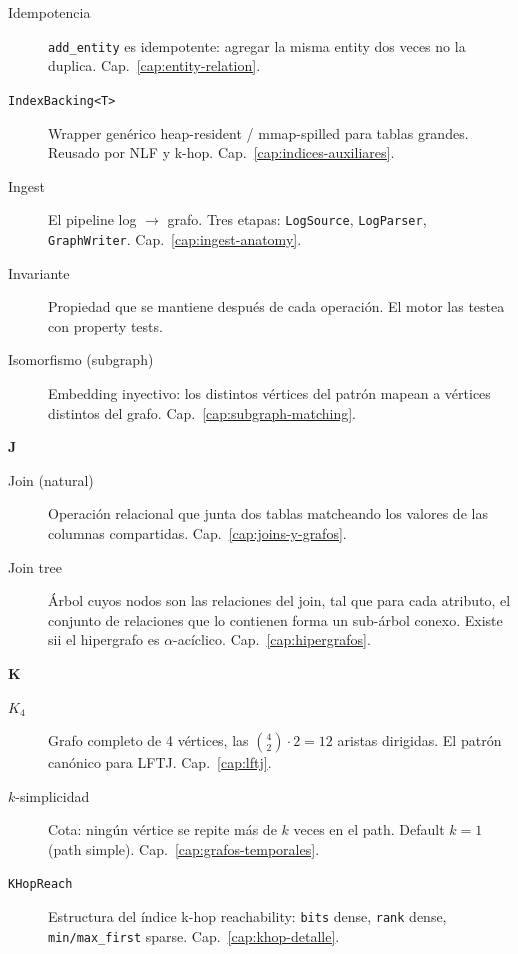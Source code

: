 \begin{description}
    \item[Idempotencia] \texttt{add\_entity} es idempotente: agregar
    la misma entity dos veces no la duplica. Cap.~\ref{cap:entity-relation}.

    \item[\texttt{IndexBacking<T>}] Wrapper genérico
    heap-resident / mmap-spilled para tablas grandes. Reusado por
    NLF y k-hop. Cap.~\ref{cap:indices-auxiliares}.

    \item[Ingest] El pipeline log $\to$ grafo. Tres etapas:
    \texttt{LogSource}, \texttt{LogParser}, \texttt{GraphWriter}.
    Cap.~\ref{cap:ingest-anatomy}.

    \item[Invariante] Propiedad que se mantiene después de cada
    operación. El motor las testea con property tests.

    \item[Isomorfismo (subgraph)] Embedding inyectivo: los
    distintos vértices del patrón mapean a vértices distintos del
    grafo. Cap.~\ref{cap:subgraph-matching}.
\end{description}

\noindent
\textbf{J}

\begin{description}
    \item[Join (natural)] Operación relacional que junta dos tablas
    matcheando los valores de las columnas compartidas.
    Cap.~\ref{cap:joins-y-grafos}.

    \item[Join tree] Árbol cuyos nodos son las relaciones del join,
    tal que para cada atributo, el conjunto de relaciones que lo
    contienen forma un sub-árbol conexo. Existe sii el hipergrafo
    es \(\alpha\)-acíclico. Cap.~\ref{cap:hipergrafos}.
\end{description}

\noindent
\textbf{K}

\begin{description}
    \item[\(K_4\)] Grafo completo de 4 vértices, las
    \(\binom{4}{2} \cdot 2 = 12\) aristas dirigidas. El patrón
    canónico para LFTJ. Cap.~\ref{cap:lftj}.

    \item[\(k\)-simplicidad] Cota: ningún vértice se repite más de
    \(k\) veces en el path. Default \(k = 1\) (path simple).
    Cap.~\ref{cap:grafos-temporales}.

    \item[\texttt{KHopReach}] Estructura del índice k-hop
    reachability: \texttt{bits} dense, \texttt{rank} dense,
    \texttt{min/max\_first} sparse. Cap.~\ref{cap:khop-detalle}.
\end{description}

